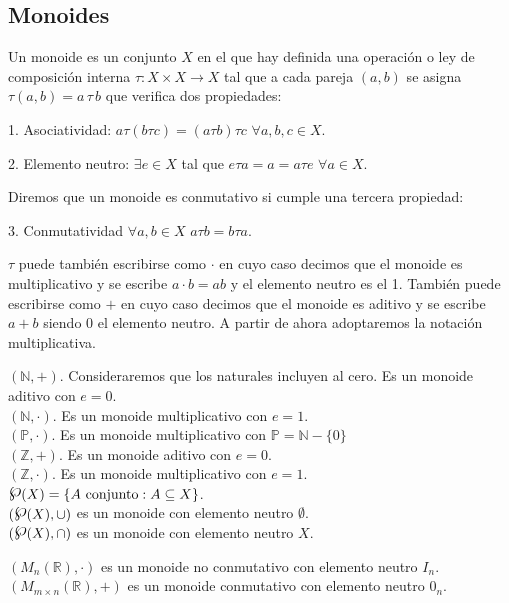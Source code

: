 \subsection{Monoides}

\begin{definition}[Monoide]
Un monoide es un conjunto $X$ en el que hay definida una operación o ley de composición interna $\tau:X \times X \rightarrow X$ tal que a cada pareja $(a,b)$ se asigna $\tau(a,b) = a \, \tau \, b$ que verifica dos propiedades:

1. Asociatividad: $a \tau (b \tau c) = (a \tau b) \tau c$ $\forall a,b,c \in X$.

2. Elemento neutro: $\exists e \in X$ tal que $e \tau a = a = a \tau e$ $\forall a \in X$.

Diremos que un monoide es conmutativo si cumple una tercera propiedad:

3. Conmutatividad $\forall a,b \in X$ $a \tau b = b \tau a$.
\end{definition}

$\tau$ puede también escribirse como $\cdot$ en cuyo caso decimos que el monoide es multiplicativo y se escribe $a \cdot b = ab$ y el elemento neutro es el 1. También puede escribirse como $+$ en cuyo caso decimos que el monoide es aditivo y se escribe $a+b$ siendo 0 el elemento neutro. A partir de ahora adoptaremos la notación multiplicativa. 

\begin{example}
$(\mathbb{N},+)$. Consideraremos que los naturales incluyen al cero. Es un monoide aditivo con $e = 0$.\\
$(\mathbb{N},\cdot)$. Es un monoide multiplicativo con $e = 1$.\\
$(\mathbb{P},\cdot)$. Es un monoide multiplicativo con $\mathbb{P} = \mathbb{N} - \{0\}$\\
$(\mathbb{Z},+)$. Es un monoide aditivo con $e = 0$. \\
$(\mathbb{Z},\cdot)$. Es un monoide multiplicativo con $e = 1$.\\
$\powerset(X) = \{A \text{ conjunto}:A \subseteq X\}$.\\ 
$(\powerset(X),\cup)$ es un monoide con elemento neutro $\emptyset$.\\
$(\powerset(X),\cap)$ es un monoide con elemento neutro $X$.
\end{example}

\begin{example}
$(M_n(\mathbb{R}),\cdot)$ es un monoide no conmutativo con elemento neutro $I_n$. \\
$(M_{m \times n}(\mathbb{R}),+)$ es un monoide conmutativo con elemento neutro $0_n$. 
\end{example}

